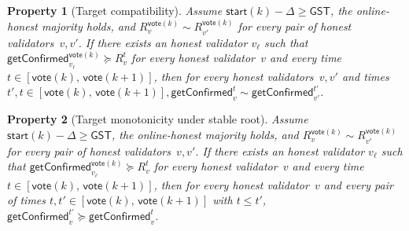 \documentclass{article}
\newcommand{\start}{\mathsf{start}}
\newcommand{\vote}{\mathsf{vote}}
\newcommand{\getConfirmed}{\textsf{getConfirmed}\xspace}
\theoremstyle{plain}
\newtheorem{property}{Property}
\theoremstyle{definition}
\theoremstyle{remark}
\newcommand{\GST}{\ensuremath{\mathsf{GST}}}
\newcommand{\OHM}{online-honest majority\xspace}
\begin{document}
\begin{property}[Target compatibility]\label{rev:prop:getConfirmed-compat}
Assume $\start(k) - \Delta \geq \GST$, the \OHM holds, and $R_v^{\vote(k)} \sim R_{v'}^{\vote(k)}$ for every pair of honest validators~$v, v'$.
If there exists an honest validator $v_\ell$ such that $\getConfirmed_{v_\ell}^{\vote(k)} \succeq R_{v}^t$ for every honest validator~$v$ and every time $t \in [\vote(k),\, \vote(k+1)]$, then for every honest validators~$v,v'$ and times $t',t \in [\vote(k),\, \vote(k+1)], \getConfirmed_v^{t} \sim \getConfirmed_{v'}^{t'}$.
\end{property}

\begin{property}[Target monotonicity under stable root]\label{rev:prop:target-monotonicity}
Assume $\start(k) - \Delta \geq \GST$, the \OHM holds, and $R_v^{\vote(k)} \sim R_{v'}^{\vote(k)}$ for every pair of honest validators~$v, v'$.
If there exists an honest validator $v_\ell$ such that $\getConfirmed_{v_\ell}^{\vote(k)} \succeq R_{v}^t$ for every honest validator~$v$ and every time $t \in [\vote(k),\, \vote(k+1)]$, then for every honest validator~$v$ and every pair of times $t, t' \in [\vote(k),\, \vote(k+1)]$ with $t \leq t'$, $\getConfirmed_v^{t'} \succeq \getConfirmed_v^t$.
\end{property}
\end{document}
